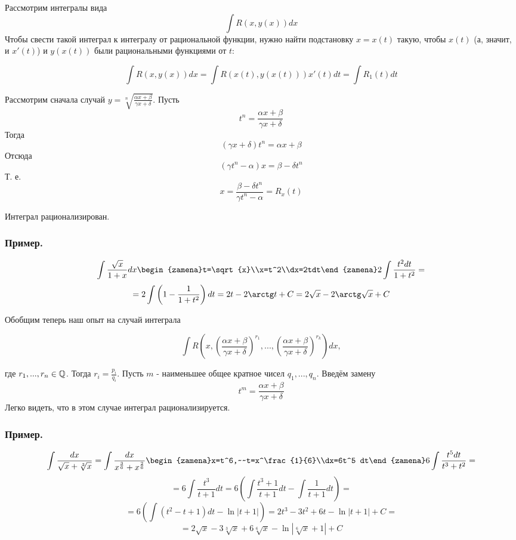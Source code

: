 Рассмотрим интегралы вида
$$\int R(x,y(x))dx$$
Чтобы свести такой интеграл к интегралу от рациональной функции, нужно найти подстановку $x=x(t)$ такую, чтобы $x(t)$ (а, значит, и $x'(t)$) и $y(x(t))$ были рациональными функциями от $t$:

$$\int R(x,y(x))dx=\int R(x(t),y(x(t)))x'(t)dt=\int R_1(t)dt$$

Рассмотрим сначала случай $y=\sqrt[n]{\frac{\alpha x+ \beta}{\gamma x+ \delta}}$. Пусть
$$t^n=\frac{\alpha x+ \beta}{\gamma x+ \delta}$$
Тогда $$(\gamma x + \delta)t^n=\alpha x + \beta$$
Отсюда $$ (\gamma t^n - \alpha)x = \beta - \delta t^n$$
Т. е. $$x = \frac{\beta - \delta t^n}{\gamma t^n - \alpha}=R_x(t)$$

Интеграл рационализирован.

\subsubsection{Пример.}

$$\int\frac{\sqrt{x}}{1+x}dx\begin{zamena}t=\sqrt{x}\\x=t^2\\dx=2tdt\end{zamena}2\int\frac{t^2 dt}{1+t^2}=$$$$=
2\int\left(1-\frac{1}{1+t^2}\right)dt=2t-2\arctg t+C=2\sqrt{x}-2 \arctg\sqrt{x}+C$$

Обобщим теперь наш опыт на случай интеграла

$$\int R\left( x, \left(\frac{\alpha x + \beta}{\gamma x + \delta}\right)^{r_1},...,\left(\frac{\alpha x + \beta}{\gamma x + \delta}\right)^{r_k}\right)dx,$$

где $r_1,...,r_n \in \mathbb{Q}$. Тогда $r_i = \frac{p_i}{q_i}$. Пусть $m$ - наименьшее общее кратное чисел $q_1,...,q_n$. Введём замену
$$t^m=\frac{\alpha x+ \beta}{\gamma x+ \delta}$$
Легко видеть, что в этом случае интеграл рационализируется.

\subsubsection{Пример.}

$$\int\frac{dx}{\sqrt{x}+\sqrt[3]{x}}=\int\frac{dx}{x^\frac{3}{6}+x^\frac{2}{6}}
\begin{zamena}x=t^6,~~t=x^\frac{1}{6}\\dx=6t^5 dt\end{zamena}6\int\frac{t^5 dt}{t^3+t^2}=$$$$=
6\int\frac{t^3}{t+1}dt=6\left(\int\frac{t^3+1}{t+1}dt-\int\frac{1}{t+1}dt\right)=$$$$=
6\left(\int(t^2-t+1)dt-\ln|t+1|\right)=2t^3-3t^2+6t-\ln|t+1|+C=$$$$=
2\sqrt{x}-3\sqrt[3]{x}+6\sqrt[6]{x}-\ln|\sqrt[6]{x}+1|+C
$$


